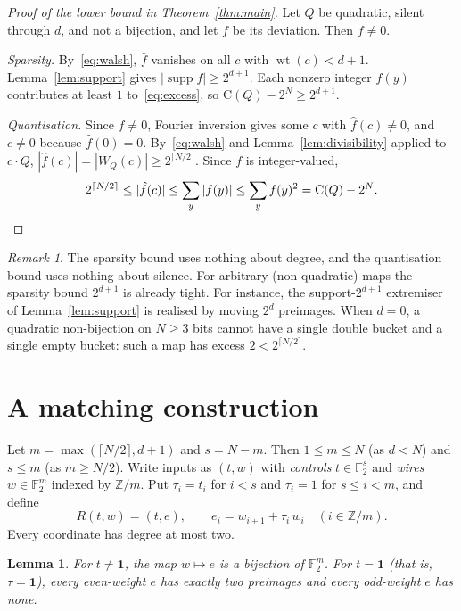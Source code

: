 \documentclass[11pt]{article}
\newtheorem{lemma}[theorem]{Lemma}
\theoremstyle{definition}
\theoremstyle{remark}
\newtheorem{remark}[theorem]{Remark}
\newcommand{\F}{\mathbb{F}_2}
\newcommand{\wt}{\operatorname{wt}}
\newcommand{\W}{W}
\newcommand{\Coll}{\mathrm{C}}
\newcommand{\one}{\mathbf{1}}
\begin{document}
\begin{proof}[Proof of the lower bound in Theorem~\ref{thm:main}]
Let $Q$ be quadratic, silent through $d$, and not a bijection, and let $f$ be
its deviation. Then $f\ne0$.

\emph{Sparsity.} By~\eqref{eq:walsh}, $\hat f$ vanishes on all $c$ with
$\wt(c)<d+1$. Lemma~\ref{lem:support} gives
$|\operatorname{supp} f|\ge2^{d+1}$. Each nonzero integer $f(y)$ contributes at
least $1$ to~\eqref{eq:excess}, so $\Coll(Q)-2^N\ge 2^{d+1}$.

\emph{Quantisation.} Since $f\ne0$, Fourier inversion gives some $c$ with $\hat
f(c)\ne0$, and $c\ne0$ because $\hat f(0)=0$. By~\eqref{eq:walsh} and
Lemma~\ref{lem:divisibility} applied to $c\cdot Q$,
$|\hat f(c)|=|\W_Q(c)|\ge 2^{\lceil N/2\rceil}$. Since $f$ is integer-valued,
\[
  2^{\lceil N/2\rceil}\le|\hat f(c)|\le\sum_y|f(y)|\le\sum_y f(y)^2=\Coll(Q)-2^N.
  \qedhere
\]
\end{proof}

\begin{remark}
The sparsity bound uses nothing about degree, and the quantisation bound uses
nothing about silence. For arbitrary (non-quadratic) maps the sparsity bound
$2^{d+1}$ is already tight. For instance, the support-$2^{d+1}$ extremiser of
Lemma~\ref{lem:support} is realised by moving $2^d$ preimages. When $d=0$, a
quadratic non-bijection on $N\ge3$ bits cannot have a single double bucket and
a single empty bucket: such a map has excess $2<2^{\lceil N/2\rceil}$.
\end{remark}

\section{A matching construction}

Let $m=\max(\lceil N/2\rceil,d+1)$ and $s=N-m$. Then $1\le m\le N$ (as $d<N$)
and $s\le m$ (as $m\ge N/2$). Write inputs as $(t,w)$ with \emph{controls}
$t\in\F^s$ and \emph{wires} $w\in\F^m$ indexed by $\mathbb{Z}/m$. Put
$\tau_i=t_i$ for $i<s$ and $\tau_i=1$ for $s\le i<m$, and define
\[
  R(t,w)=(t,e),\qquad e_i=w_{i+1}+\tau_i\,w_i\quad(i\in\mathbb{Z}/m).
\]
Every coordinate has degree at most two.

\begin{lemma}\label{lem:ring}
For $t\ne\one$, the map $w\mapsto e$ is a bijection of $\F^m$. For $t=\one$
(that is, $\tau=\one$), every even-weight $e$ has exactly two preimages and every
odd-weight $e$ has none.
\end{lemma}
\end{document}
